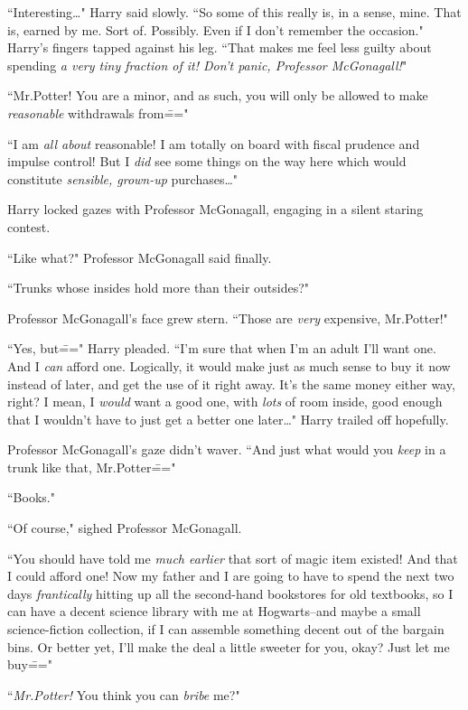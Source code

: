 ``Interesting{\ldots}" Harry said slowly. ``So some of this really is, in a sense, mine. That is, earned by me. Sort of. Possibly. Even if I don't remember the occasion." Harry's fingers tapped against his leg. ``That makes me feel less guilty about spending \emph{a very tiny fraction of it! Don't panic, Professor McGonagall!}"

``Mr.\?Potter! You are a minor, and as such, you will only be allowed to make \emph{reasonable} withdrawals from\==="

``I am \emph{all about} reasonable! I am totally on board with fiscal prudence and impulse control! But I \emph{did} see some things on the way here which would constitute \emph{sensible, grown-up} purchases{\ldots}"

Harry locked gazes with Professor McGonagall, engaging in a silent staring contest.

``Like what?" Professor McGonagall said finally.

``Trunks whose insides hold more than their outsides?"

Professor McGonagall's face grew stern. ``Those are \emph{very} expensive, Mr.\?Potter!"

``Yes, but\===" Harry pleaded. ``I'm sure that when I'm an adult I'll want one. And I \emph{can} afford one. Logically, it would make just as much sense to buy it now instead of later, and get the use of it right away. It's the same money either way, right? I mean, I \emph{would} want a good one, with \emph{lots} of room inside, good enough that I wouldn't have to just get a better one later{\ldots}" Harry trailed off hopefully.

Professor McGonagall's gaze didn't waver. ``And just what would you \emph{keep} in a trunk like that, Mr.\?Potter\==="

``Books."

``Of course," sighed Professor McGonagall.

``You should have told me \emph{much earlier} that sort of magic item existed! And that I could afford one! Now my father and I are going to have to spend the next two days \emph{frantically} hitting up all the second-hand bookstores for old textbooks, so I can have a decent science library with me at Hogwarts\---and maybe a small science-fiction collection, if I can assemble something decent out of the bargain bins. Or better yet, I'll make the deal a little sweeter for you, okay? Just let me buy\==="

``\emph{Mr.\?Potter!} You think you can \emph{bribe} me?"

